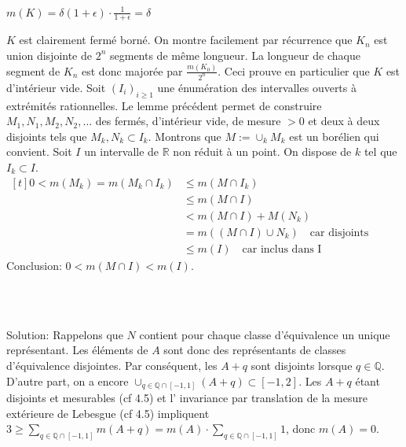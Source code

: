 \documentclass{report}
\begin{document}
 \centerline{$m(K) = \delta(1+\epsilon)\cdot\frac{1}{1+\epsilon}  = \delta$} \newline
 $K$ est clairement fermé borné. On montre facilement par récurrence que $K_n$ est union disjointe de $2^n$ segments de même longueur. La longueur de chaque segment de $K_n$ est donc majorée par $\frac{m(K_0)}{2^n}$. Ceci prouve en particulier que $K$ est d'intérieur vide. \newline
 \newline
 Soit $(I_i)_{i\geq 1}$ une énumération des intervalles ouverts à extrémités rationnelles. Le lemme précédent permet de construire $M_1,N_1,M_2,N_2,\ldots$ des fermés, d'intérieur vide, de mesure $>0$ et deux à deux disjoints tels que $M_k,N_k\subset I_k$. Montrons que $M:=\cup_k M_k$ est un borélien qui convient.\newline
 Soit $I$ un intervalle de $\mathbb R$ non réduit à un point. On dispose de $k$ tel que $I_k\subset I$.\newline
 $\begin{aligned}[t]0<m(M_k) = m(M_k\cap I_k)&\leq m(M\cap I_k)\\
 &\leq m(M\cap I)\\
 &< m(M\cap I) + M(N_k) \\
 &= m((M\cap I)\cup N_k) \quad \text{car disjoints}\\
 &\leq m(I) \quad \text{car inclus dans I}\end{aligned}$\newline
 Conclusion: $0<m(M\cap I)<m(I)$.

\subsection{} \\ \\

Solution: Rappelons que $N$ contient pour chaque classe d'équivalence un unique représentant. Les éléments de $A$ sont donc des représentants de classes d'équivalence disjointes. Par conséquent, les $A+q$ sont disjoints lorsque $q\in \mathbb Q$. D'autre part, on a encore $\cup_{q\in \mathbb Q \cap [-1,1]} (A+q) \subset [-1,2]$. Les $A+q$ étant disjoints et mesurables (cf 4.5) et l' invariance par translation de la mesure extérieure de Lebesgue (cf 4.5) impliquent $3\geq \sum_{q\in \mathbb Q \cap [-1,1]} m(A+q) = m(A)\cdot \sum_{q\in \mathbb Q \cap [-1,1]} 1$, donc $m(A)=0$.
\end{document}
